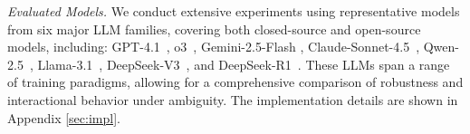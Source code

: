 \documentclass[sigconf]{acmart}
\begin{document}
\textit{Evaluated Models.}
We conduct extensive experiments using representative models from six major LLM families, covering both closed-source and open-source models, including:
GPT-4.1~\cite{openai_gpt41},
o3~\cite{openai_gpto3},
Gemini-2.5-Flash \cite{comanici2025gemini},
Claude-Sonnet-4.5~\cite{claude},
Qwen-2.5~\cite{qwen2025qwen25technicalreport},
Llama-3.1~\cite{dubey2024llama},
DeepSeek-V3~\cite{liu2024deepseek},
and DeepSeek-R1~\cite{guo2025deepseek}.
These LLMs span a range of training paradigms, allowing for a comprehensive comparison of robustness and interactional behavior under ambiguity.
The implementation details are shown in Appendix \ref{sec:impl}.


\end{document}
